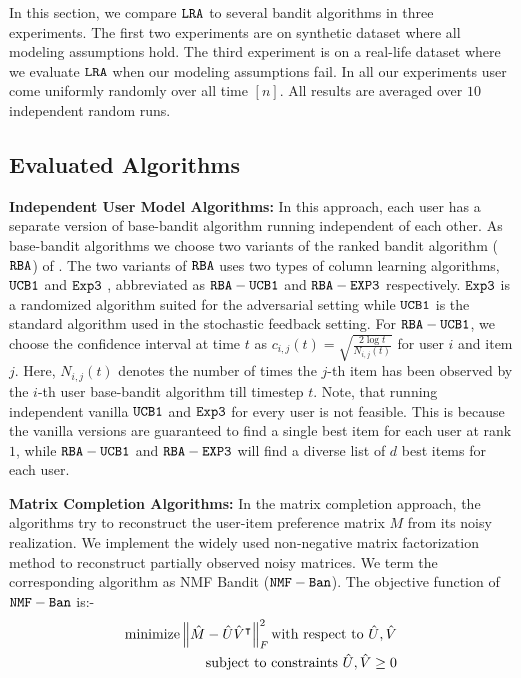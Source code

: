 In this section, we compare ${\tt LRA}$ to several bandit algorithms in three experiments. The first two experiments are on synthetic dataset where all modeling assumptions hold. The third experiment is on a real-life dataset where we evaluate ${\tt LRA}$ when our modeling assumptions fail. In all our experiments user come uniformly randomly over all time $[n]$. All results are averaged over $10$ independent random runs.

\subsection{Evaluated Algorithms}
\textbf{Independent User Model Algorithms:} In this approach, each user has a separate version of base-bandit algorithm running independent of each other. As base-bandit algorithms we choose two variants of the ranked bandit algorithm (${\tt RBA}$) of \citet{radlinski2008learning}. The two variants of ${\tt RBA}$ uses two types of column learning algorithms, ${\tt UCB1}$ \citep{auer2002finite} and ${\tt Exp3}$ \citep{auer2002nonstochastic}, abbreviated as ${\tt RBA-UCB1}$ and ${\tt RBA-EXP3}$ respectively. ${\tt Exp3}$ is a randomized algorithm suited for the adversarial setting while ${\tt UCB1}$ is the standard algorithm used in the stochastic feedback setting. For ${\tt RBA-UCB1}$, we choose the confidence interval at time $t$ as $c_{i, j}(t) = \sqrt{\frac{ 2\log t}{N_{i, j}(t)}}$ for user $i$ and item $j$. Here, $N_{i, j}(t)$ denotes the number of times the $j$-th item has been observed by the $i$-th user base-bandit algorithm till timestep $t$. Note, that running independent vanilla ${\tt UCB1}$ and ${\tt Exp3}$ for every user is not feasible. This is because the vanilla versions are guaranteed to find a single best item for each user at rank $1$, while ${\tt RBA-UCB1}$ and ${\tt RBA-EXP3}$ will find a diverse list of $d$ best items for each user.



\textbf{Matrix Completion Algorithms:} In the matrix completion approach, the algorithms try to reconstruct the user-item preference matrix $M$ from its noisy realization. We implement the widely used non-negative matrix factorization method to reconstruct partially observed noisy matrices. We term the corresponding algorithm as NMF Bandit (${\tt NMF-Ban}$). The objective function of ${\tt NMF-Ban}$ is:-
\begin{align*}
\text{minimize} \left\lVert\hat{M} - \hat{U}\hat{V}^\intercal\right\rVert_{F}^{2} \text{with respect to $\hat{U}, \hat{V}$}\\
\text{ subject to constraints } \hat{U}, \hat{V} \geq 0
\end{align*}

